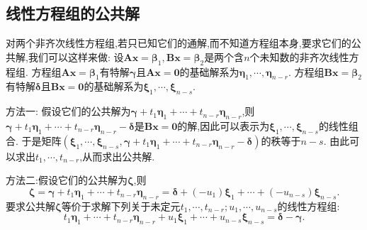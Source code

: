 \documentclass[../../main.tex]{subfiles}%
\begin{document}
\subsection{线性方程组的公共解}

对两个非齐次线性方程组,若只已知它们的通解,而不知道方程组本身,要求它们的公共解,我们可以这样来做:
设\(\boldsymbol{A}\boldsymbol{x}=\boldsymbol{\beta}_1,\boldsymbol{B}\boldsymbol{x}=\boldsymbol{\beta}_2\)是两个含\(n\)个未知数的非齐次线性方程组. 方程组\(\boldsymbol{A}\boldsymbol{x}=\boldsymbol{\beta}_1\)有特解\(\boldsymbol{\gamma}\)且\(\boldsymbol{A}\boldsymbol{x}=\boldsymbol{0}\)的基础解系为\(\boldsymbol{\eta}_1,\cdots,\boldsymbol{\eta}_{n - r}\). 方程组\(\boldsymbol{B}\boldsymbol{x}=\boldsymbol{\beta}_2\)有特解\(\boldsymbol{\delta}\)且\(\boldsymbol{B}\boldsymbol{x}=\boldsymbol{0}\)的基础解系为\(\boldsymbol{\xi}_1,\cdots,\boldsymbol{\xi}_{n - s}\).

{\color{blue}方法一:} 假设它们的公共解为\(\boldsymbol{\gamma}+t_1\boldsymbol{\eta}_1+\cdots+t_{n - r}\boldsymbol{\eta}_{n - r}\),则\(\boldsymbol{\gamma}+t_1\boldsymbol{\eta}_1+\cdots+t_{n - r}\boldsymbol{\eta}_{n - r}-\boldsymbol{\delta}\)是\(\boldsymbol{B}\boldsymbol{x}=\boldsymbol{0}\)的解,因此可以表示为\(\boldsymbol{\xi}_1,\cdots,\boldsymbol{\xi}_{n - s}\)的线性组合. 于是矩阵\((\boldsymbol{\xi}_1,\cdots,\boldsymbol{\xi}_{n - s},\boldsymbol{\gamma}+t_1\boldsymbol{\eta}_1+\cdots+t_{n - r}\boldsymbol{\eta}_{n - r}-\boldsymbol{\delta})\)的秩等于\(n - s\). 由此可以求出\(t_1,\cdots,t_{n - r}\),从而求出公共解.

{\color{blue}方法二:}假设它们的公共解为\(\boldsymbol{\zeta}\),则
\[
\boldsymbol{\zeta}=\boldsymbol{\gamma}+t_1\boldsymbol{\eta}_1+\cdots+t_{n - r}\boldsymbol{\eta}_{n - r}=\boldsymbol{\delta}+(-u_1)\boldsymbol{\xi}_1+\cdots+(-u_{n - s})\boldsymbol{\xi}_{n - s}.
\]
要求公共解\(\boldsymbol{\zeta}\)等价于求解下列关于未定元\(t_1,\cdots,t_{n - r};u_1,\cdots,u_{n - s}\)的线性方程组:
\[
t_1\boldsymbol{\eta}_1+\cdots+t_{n - r}\boldsymbol{\eta}_{n - r}+u_1\boldsymbol{\xi}_1+\cdots+u_{n - s}\boldsymbol{\xi}_{n - s}=\boldsymbol{\delta}-\boldsymbol{\gamma}.
\]
\end{document}
